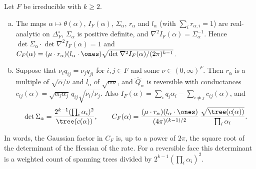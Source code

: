 \begin{proposition}\label{prop:constant}
Let $F$ be irreducible with $k\ge2$.
\begin{enumerate}[(a)]
\item The maps $\alpha\mapsto\theta(\alpha)$, $I_F(\alpha)$, $\Sigma_\alpha$,
$r_\alpha$ and $l_\alpha$ (with $\sum_ir_{\alpha,i}=1$) are real-analytic on
$\Delta_F^\circ$, $\Sigma_\alpha$ is positive definite, and
$\nabla^2I_F(\alpha)=\Sigma_\alpha^{-1}$. Hence
$\det\Sigma_\alpha\cdot\det\nabla^2I_F(\alpha)=1$ and
$C_F(\alpha)=(\mu\cdot r_\alpha)(l_\alpha\cdot\ones)
\sqrt{\det\nabla^2I_F(\alpha)/(2\pi)^{k-1}}$.
\item Suppose that $\nu_iq_{ij}=\nu_jq_{ji}$ for $i,j\in F$ and some
$\nu\in(0,\infty)^F$. Then $r_\alpha$ is a multiple of $\sqrt{\alpha/\nu}$
and $l_\alpha$ of $\sqrt{\alpha\nu}$, and $\widehat Q_\alpha$ is reversible
with conductances $c_{ij}(\alpha)=\sqrt{\alpha_i\alpha_j}\,q_{ij}\sqrt{\nu_i/\nu_j}$.
Also $I_F(\alpha)=\sum_iq_i\alpha_i-\sum_{i\ne j}c_{ij}(\alpha)$, and
\[
\det\Sigma_\alpha=\frac{2^{k-1}(\prod_i\alpha_i)^2}{\tree(c(\alpha))},\qquad
C_F(\alpha)=\frac{(\mu\cdot r_\alpha)(l_\alpha\cdot\ones)}{(4\pi)^{(k-1)/2}}
\,\frac{\sqrt{\tree(c(\alpha))}}{\prod_i\alpha_i}.
\]
\end{enumerate}
\end{proposition}

In words, the Gaussian factor in $C_F$ is, up to a power of $2\pi$, the square root
of the determinant of the Hessian of the rate. For a reversible face this determinant
is a weighted count of spanning trees divided by $2^{k-1}(\prod_i\alpha_i)^2$.

